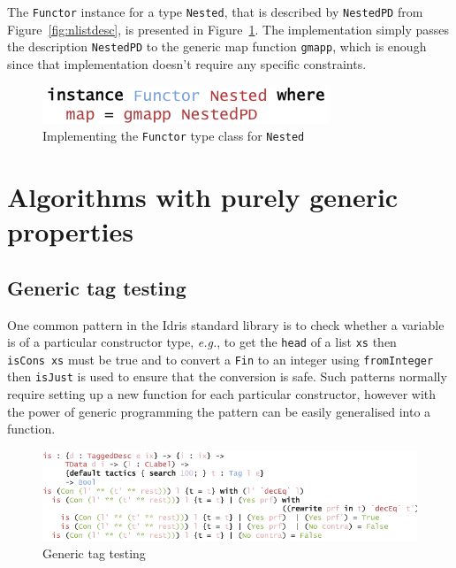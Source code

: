 \documentclass{ituthesis}
\newcommand{\tttype}[1]{\textcolor{type-color}{\texttt{#1}}}
\newcommand{\ttdec}[1]{\textcolor{declared-var-color}{\texttt{#1}}}
\newcommand{\ttvar}[1]{\textcolor{local-var-color}{\texttt{#1}}}
\theoremstyle{break}
\begin{document}
The \tttype{Functor} instance for a type \ttdec{Nested}, that is described by \ttdec{NestedPD} from Figure~\ref{fig:nlistdesc}, is presented in Figure~\ref{fig:functorinst}.
The implementation simply passes the description \ttdec{NestedPD} to the generic map function \ttdec{gmapp}, which is enough since that implementation doesn't require any specific constraints.

\begin{figure}[ht]
\begin{center}
    \includegraphics[scale=0.5]{Figures/GenericFunctorInstance.png}
\end{center}
\caption{Implementing the \tttype{Functor} type class for \ttdec{Nested}}
\label{fig:functorinst}
\end{figure}

\section{Algorithms with purely generic properties}
\label{sec:Algorithms with purely generic properties}
\subsection{Generic tag testing}
\label{sub:Generic tag testing}
One common pattern in the Idris standard library is to check whether a variable is of a particular constructor type, \textit{e.g.},
to get the \ttdec{head} of a list \ttvar{xs} then \ttdec{isCons}~\ttvar{xs} must be true and to convert a \tttype{Fin} to an integer using \ttdec{fromInteger} then \ttdec{isJust} is used to ensure that the conversion is safe.
Such patterns normally require setting up a new function for each particular constructor, however with the power of generic programming the pattern can be easily generalised into a function.

\begin{figure}[ht]
\begin{center}
    \includegraphics[scale=0.5]{Figures/GenericIs.png}
\end{center}
\caption{Generic tag testing}
\label{fig:isgen}
\end{figure}
\end{document}
